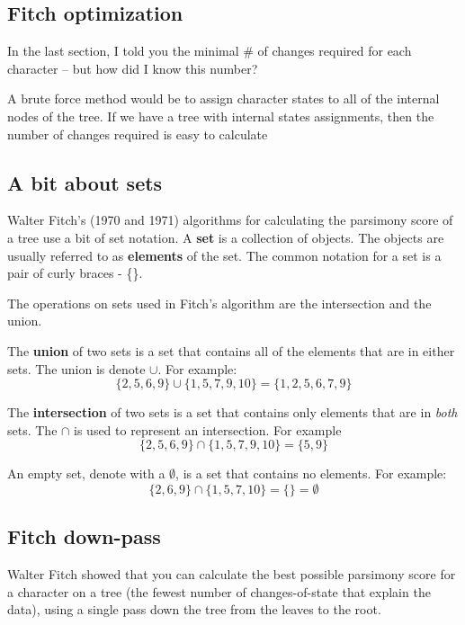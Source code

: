 \documentclass[11pt]{article}
\begin{document}
\subsection*{Fitch optimization}
In the last section, I told you the minimal \# of changes required for each character -- but how did I know this number?

A brute force method would be to assign character states to all of the internal nodes of the tree.
If we have a tree with internal states assignments, then the number of changes required is easy to calculate

\subsection*{A bit about sets}
Walter Fitch's (1970 and 1971) algorithms for calculating the parsimony score of a tree use a bit of set notation. 
A {\bf set} is a collection of objects.  
The objects are usually referred to as {\bf elements} of the set.
The common notation for a set is a pair of curly braces - \{\}.

The operations on sets used in Fitch's algorithm are the intersection and the union.

The {\bf union} of two sets is a set that contains all of the elements that are in either sets. The union is denote $\cup$. For example:
\[\{ 2,5, 6, 9 \}\cup\{ 1,5, 7, 9, 10 \} = \{1,2,5,6,7,9\}\]

The {\bf intersection} of two sets is a set that contains only elements that are in {\em both} sets.
The $\cap$ is used to represent an intersection.
For example
\[\{ 2,5, 6, 9 \}\cap\{ 1,5, 7, 9, 10 \} = \{5,9\}\]

An empty set, denote with a  $\emptyset$, is a set that contains no elements. For example:
\[\{ 2, 6, 9 \}\cap\{ 1,5, 7, 10 \} = \{\} = \emptyset\]

\subsection*{Fitch down-pass}
Walter Fitch showed that you can calculate the best possible parsimony score for a character on a tree (the fewest number of changes-of-state that explain the data), using
a single pass down the tree from the leaves to the root.
\end{document}
